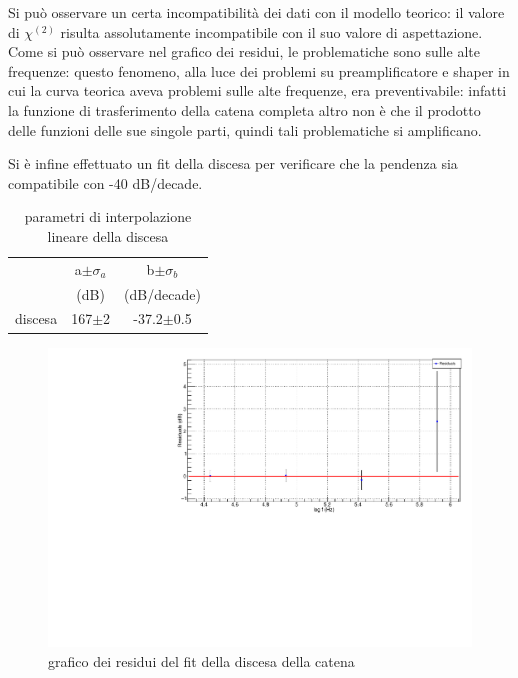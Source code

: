 \documentclass{article}
\begin{document}
Si può osservare un certa incompatibilità dei dati con il modello teorico: il valore
di $\chi^{(2)}$ risulta assolutamente incompatibile con il suo valore di aspettazione.
Come si può osservare nel grafico dei residui, le problematiche sono sulle alte frequenze:
questo fenomeno, alla luce dei problemi su preamplificatore e shaper in cui la curva teorica
aveva problemi sulle alte frequenze, era preventivabile: infatti la funzione di trasferimento
della catena completa altro non è che il prodotto delle funzioni delle sue singole parti, quindi 
tali problematiche si amplificano.

Si è infine effettuato un fit della discesa per verificare che la pendenza sia compatibile con -40 dB/decade.

\begin{table}[ht]
    \centering
    \begin{tabular}{rcccc}
        \toprule
                &\multicolumn{2}{c}{a$\pm \sigma_a$} &\multicolumn{2}{c}{b$\pm \sigma_b$}\\
                &\multicolumn{2}{c}{(dB)}  &\multicolumn{2}{c}{(dB/decade)}\\
        \midrule
        discesa &\multicolumn{2}{c}{167$\pm$2}&\multicolumn{2}{c}{-37.2$\pm$0.5}\\
        \bottomrule
    \end{tabular}
    \caption{parametri di interpolazione lineare della discesa}
\end{table}


\begin{center}
    \begin{figure}[H]
    \centering
    \includegraphics[scale=0.375, angle=0]{residuicatenadiscesa.pdf}
    \caption{grafico dei residui del fit della discesa della catena}
    \label{fig:residuicatenadiscesa}
    \end{figure}
\end{center}
\end{document}
